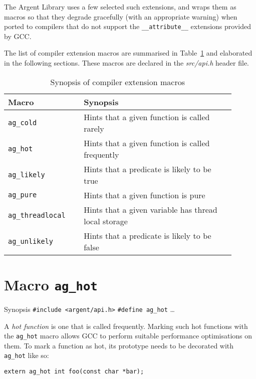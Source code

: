 The Argent Library uses a few selected such extensions, and wraps them as macros
so that they degrade gracefully (with an appropriate warning) when ported to 
compilers that do not support the \verb|__attribute__| extensions provided
by GCC.

The list of compiler extension macros are summarised in Table~\ref{tab:synopsis}
and elaborated in the following sections. These macros are declared in the
\emph{src/api.h} header file.

\renewcommand\arraystretch{1.1}
\begin{table}[!htbp]
\centering
\small
\begin{tabular}[t]{>{\centering}m{0.3\linewidth}
    >{\raggedright\arraybackslash}m{0.6\linewidth}}
\toprule
\textbf{Macro} & \textbf{Synopsis} \\
\midrule
\verb|ag_cold| & Hints that a given function is called rarely \\
\verb|ag_hot| & Hints that a given function is called frequently \\
\verb|ag_likely| & Hints that a predicate is likely to be true \\
\verb|ag_pure| & Hints that a given function is pure \\
\verb|ag_threadlocal| & Hints that a given variable has thread local 
    storage \\
\verb|ag_unlikely| & Hints that a predicate is likely to be false \\
\bottomrule
\end{tabular}
\caption{Synopsis of compiler extension macros}
\label{tab:synopsis}
\end{table}


\section{Macro \texttt{ag\_hot}}

\begin{bclogo}[logo=\bccrayon, noborder=true, barre=snake, couleurBarre=gray]
    {Synopsis}
  \verb|#include <argent/api.h>|
  \verb|#define ag_hot| \ldots
\end{bclogo}

A \emph{hot function} is one that is called frequently. Marking such hot
functions with the \verb|ag_hot| macro allows GCC to perform suitable
performance optimisations on them. To mark a function as hot, its prototype
needs to be decorated with \verb|ag_hot| like so:
\begin{lstlisting}[linewidth=1.0\linewidth]
extern ag_hot int foo(const char *bar);
\end{lstlisting}





